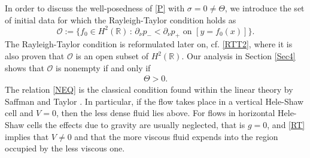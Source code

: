\documentclass[11pt,reqno]{amsart}
\numberwithin{equation}{section}
\newcommand{\0}{\Omega}
\newcommand{\p}{\partial}
\newcommand{\cO}{\mathcal{O}}
\newcommand{\R}{\mathbb{R}}
\numberwithin{equation}{section}
\begin{document}
In order to discuss the well-posedness of \eqref{P} with $\sigma=0\neq\Theta$, we introduce the set of initial data for which the Rayleigh-Taylor condition holds as
 \[
 \cO:=\{f_0\in H^2(\R)\,:\, \text{$\p_\nu p_-< \p_\nu p_+$ on $[y=f_0(x)]$}\}.
 \]
 The Rayleigh-Taylor condition is reformulated later on, cf. \eqref{RTT2}, where it is also proven that $\cO$ is an open subset of $H^2(\R)$. 
 Our analysis in Section \ref{Sec4} shows that $\cO$ is nonempty if and only if 
 \begin{align}\label{NEQ}
 \Theta >0.
 \end{align}
The relation \eqref{NEQ} is the classical condition found within the linear theory by Saffman and Taylor \cite{ST58}.  
In particular, if the flow takes place in a vertical Hele-Shaw cell and $V=0$, then the less dense fluid lies above.
For flows in   horizontal Hele-Shaw cells the effects due to gravity  are usually  neglected, that is $g=0$, and  \eqref{RT} implies
that  $V\neq0$ and that the more viscous fluid expends  into the region occupied by
the less viscous one.
  
\end{document}
